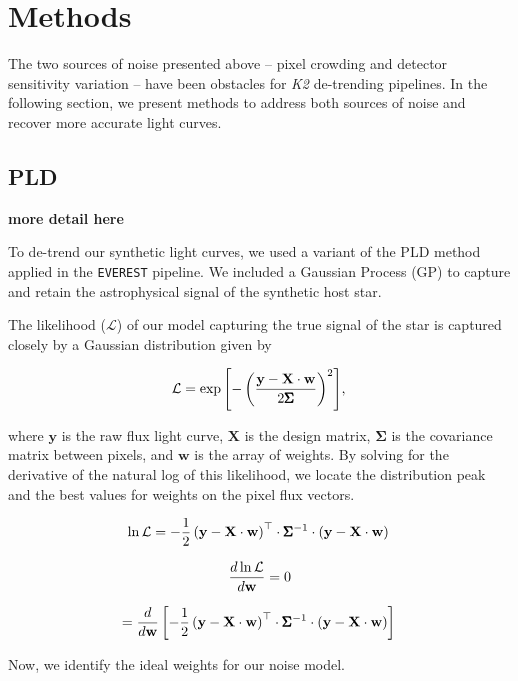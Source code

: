 \documentclass[12pt,preprint]{emulateapj}
\begin{document}
\section{Methods}

The two sources of noise presented above -- pixel crowding and detector sensitivity variation -- have been obstacles for \textit{K2} de-trending pipelines. In the following section, we present methods to address both sources of noise and recover more accurate light curves.

\subsection{PLD}

\textbf{more detail here}

To de-trend our synthetic light curves, we used a variant of the PLD method applied in the \texttt{EVEREST} pipeline. We included a Gaussian Process (GP) to capture and retain the astrophysical signal of the synthetic host star.

The likelihood ($\mathcal{L}$) of our model capturing the true signal of the star is captured closely by a Gaussian distribution given by

\[
\mathcal{L} = \exp{\left[-\left( \frac{\textbf{y}-\textbf{X}\cdot\textbf{w}}{2\pmb{\Sigma}} \right)^2 \right]}, \\
\]

where $\textbf{y}$ is the raw flux light curve, $\textbf{X}$ is the design matrix, $\pmb{\Sigma}$ is the covariance matrix between pixels, and $\textbf{w}$ is the array of weights. By solving for the derivative of the natural log of this likelihood, we locate the distribution peak and the best values for weights on the pixel flux vectors.

\[
\ln{\mathcal{L}} = - \frac{1}{2}\left(\textbf{y} - \textbf{X}\cdot\textbf{w} \right)^\top \cdot \pmb{\Sigma}^{-1} \cdot \left(\textbf{y} - \textbf{X}\cdot\textbf{w} \right) \\
\]

\[
\frac{d\ln{\mathcal{L}}}{d \textbf{w}} = 0 \\
\]

\[
=\frac{d}{d \textbf{w}} \left[ - \frac{1}{2} \left(\textbf{y} - \textbf{X}\cdot\textbf{w} \right)^\top \cdot \pmb{\Sigma}^{-1} \cdot \left(\textbf{y} - \textbf{X}\cdot\textbf{w} \right) \right] \\
\]

Now, we identify the ideal weights for our noise model.
\end{document}
